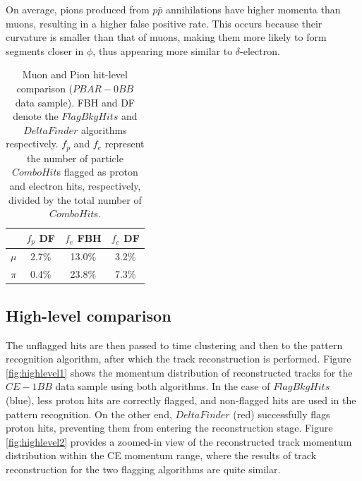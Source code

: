       On average, pions produced from $p\bar{p}$ annihilations 
      have higher momenta than muons, resulting in a higher false 
      positive rate. This occurs because their curvature is smaller 
      than that of muons, making them more likely to form segments 
      closer in $\phi$, thus appearing more similar to $\delta$-electron.


    \begin{center}
        \begin{table}[h!]
        \centering
        \renewcommand{\arraystretch}{1.}
        \begin{tabular}{| c | c | c | c|} 
        \hline
         &  $f_{p}$ DF &  $f_{e}$ FBH & $f_{e}$ DF\\
        \hline
        $\mu$  &  2.7\%  & 13.0\% & 3.2\%\\
        \hline
        $\pi$ & 0.4\% & 23.8\%& 7.3\%\\
        \hline
        \end{tabular}
        \caption{Muon and Pion 
        hit-level comparison ($PBAR-0BB$ data sample). FBH and DF denote 
        the $FlagBkgHits$ and $DeltaFinder$ algorithms respectively. $f_p$ and $f_e$ represent 
        the number of particle $ComboHit$s flagged as proton and electron hits, respectively, 
        divided by the total number of $ComboHit$s.}
        \label{tab:0bbpbar}
        \end{table}
        \end{center}

\subsection{High-level comparison}
The unflagged hits are then passed to time clustering and then to the pattern recognition algorithm, 
after which the track reconstruction is performed. 
Figure \ref{fig:highlevel1} shows the momentum 
distribution of reconstructed tracks for the $CE-1BB$ 
data sample using both algorithms. 
In the case of $FlagBkgHits$ (blue), less proton hits are  
correctly flagged, and non-flagged hits are
used in the pattern recognition. 
On the other end, $DeltaFinder$ (red) successfully flags 
proton hits, preventing them from entering the reconstruction stage. 
Figure \ref{fig:highlevel2} provides a zoomed-in view 
of the reconstructed track momentum distribution within 
the CE momentum range, where the results of track reconstruction 
for the two flagging algorithms are quite similar.

